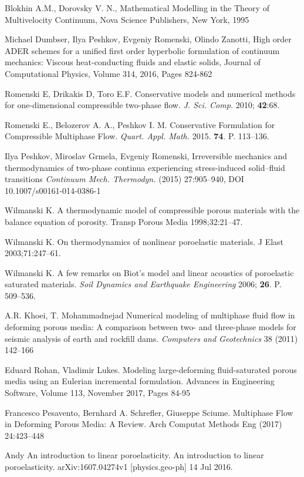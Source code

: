 \documentclass[3p,times]{elsarticle}
\begin{document}
\begin{thebibliography}{}

	
Blokhin A.M., Dorovsky V. N., Mathematical Modelling in the Theory of Multivelocity Continuum, Nova Science Publishers, New York, 1995
	
Michael Dumbser, Ilya Peshkov, Evgeniy Romenski, Olindo Zanotti,
High order ADER schemes for a unified first order hyperbolic formulation of continuum mechanics: Viscous heat-conducting fluids and elastic solids,
Journal of Computational Physics,
Volume 314,
2016,
Pages 824-862

Romenski E, Drikakis D, Toro E.F. Conservative models and numerical methods for one-dimensional compressible two-phase flow. \emph{J. Sci. Comp.} 2010; \textbf{42}:68.
	
Romenski E., Belozerov A. A., Peshkov I. M. Conservative Formulation for
Compressible Multiphase Flow. \emph{Quart. Appl. Math.} 2015. \textbf{74}. P. 113–136.

Ilya Peshkov, Miroslav Grmela, Evgeniy Romenski, Irreversible mechanics and thermodynamics of two-phase continua experiencing stress-induced solid–fluid transitions \emph{Continuum Mech. Thermodyn.} (2015) 27:905–940, DOI 10.1007/s00161-014-0386-1

Wilmanski K. A thermodynamic model of compressible porous
materials with the balance equation of porosity. Transp Porous
Media 1998;32:21–47.

Wilmanski K. On thermodynamics of nonlinear poroelastic materials.
J Elast 2003;71:247–61.

Wilmanski K. A few remarks on Biot’s model and linear acoustics of poroelastic saturated materials.
\emph{Soil Dynamics and Earthquake Engineering} 2006; \textbf{26}. P. 509–536.

A.R. Khoei, T. Mohammadnejad
Numerical modeling of multiphase fluid flow in deforming porous media:
A comparison between two- and three-phase models for seismic analysis
of earth and rockfill dams. \emph{Computers and Geotechnics} 38 (2011) 142–166

Eduard Rohan, Vladimir Lukes.
Modeling large-deforming fluid-saturated porous media using an Eulerian incremental formulation.
Advances in Engineering Software, 
Volume 113, November 2017, Pages 84-95


Francesco Pesavento, Bernhard A. Schrefler, Giuseppe Sciume.
Multiphase Flow in Deforming Porous Media: A Review.
Arch Computat Methods Eng (2017) 24:423–448

Andy An introduction to linear poroelasticity. An introduction to linear poroelasticity.
arXiv:1607.04274v1 [physics.geo-ph] 14 Jul 2016.

\end{thebibliography}{}
\end{document}
